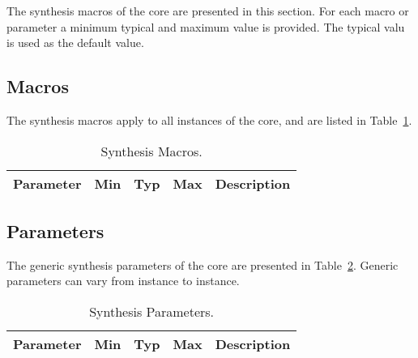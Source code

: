 \ifdefined\SMP

\ifdefined\SM

The synthesis macros of the core are presented in this section. For each macro
or parameter a minimum typical and maximum value is provided. The typical valu
is used as the default value.

\subsection{Macros}
\label{sec:macr}

The synthesis macros apply to all instances of the core, and are listed in Table~\ref{tab:sm}.

\begin{table}[H]
  \centering
    \begin{tabularx}{\textwidth}{ | c | c | c | c | X | }
    \hline
    \rowcolor{iob-green}
    {\bf Parameter} & {\bf Min} & {\bf Typ} & {\bf Max} & {\bf Description} \\\hline

    

    \end{tabularx}
  \caption{Synthesis Macros.}
  \label{tab:sm}
\end{table}

\fi

\ifdefined\SP

\subsection{Parameters}
\label{sec:param}

The generic synthesis parameters of the core are presented in Table~\ref{tab:sp}. Generic parameters can vary from instance to instance.

\begin{table}[H]
  \centering
    \begin{tabularx}{\textwidth}{ | c | c | c | c | X | }
    \hline
    \rowcolor{iob-green}
    {\bf Parameter} & {\bf Min} & {\bf Typ} & {\bf Max} & {\bf Description} \\\hline

    

    \end{tabularx}
  \caption{Synthesis Parameters.}
  \label{tab:sp}
\end{table}

\fi
\fi
